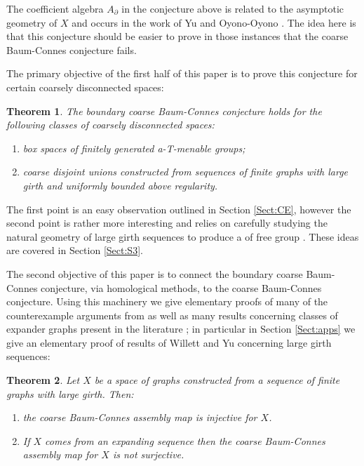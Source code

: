 \documentclass[11pt]{amsart}
\theoremstyle{plain}
\newtheorem*{thm}{Theorem}
\theoremstyle{definition}%
\theoremstyle{remark}%
\begin{document}
The coefficient algebra $A_{\partial}$ in the conjecture above is related to the asymptotic geometry of $X$ and occurs in the work of Yu and Oyono-Oyono \cite{MR2568691}. The idea here is that this conjecture should be easier to prove in those instances that the coarse Baum-Connes conjecture fails.

The primary objective of the first half of this paper is to prove this conjecture for certain coarsely disconnected spaces:

\begin{thm}
The boundary coarse Baum-Connes conjecture holds for the following classes of coarsely disconnected spaces:
\begin{enumerate}
\item box spaces of finitely generated a-T-menable groups;
\item coarse disjoint unions constructed from sequences of finite graphs with large girth and uniformly bounded above regularity.
\end{enumerate}
\end{thm}

The first point is an easy observation outlined in Section \ref{Sect:CE}, however the second point is rather more interesting and relies on carefully studying the natural geometry of large girth sequences to produce a  of free group \cite{MR2041539}. These ideas are covered in Section \ref{Sect:S3}.

The second objective of this paper is to connect the boundary coarse Baum-Connes conjecture, via homological methods, to the coarse Baum-Connes conjecture. Using this machinery we give elementary proofs of many of the counterexample arguments from \cite{MR1911663,higsonpreprint,explg1} as well as many results concerning classes of expander graphs present in the literature \cite{MR2419930,MR2764895,MR2568691}; in particular in Section \ref{Sect:apps} we give an elementary proof of results of Willett and Yu \cite{explg1} concerning large girth sequences:

\begin{thm}
Let $X$ be a space of graphs constructed from a sequence of finite graphs with large girth. Then:
\begin{enumerate}
\item the coarse Baum-Connes assembly map is injective for $X$.
\item If $X$ comes from an expanding sequence then the coarse Baum-Connes assembly map for $X$ is not surjective.
\end{enumerate}
\end{thm} 
\end{document}
